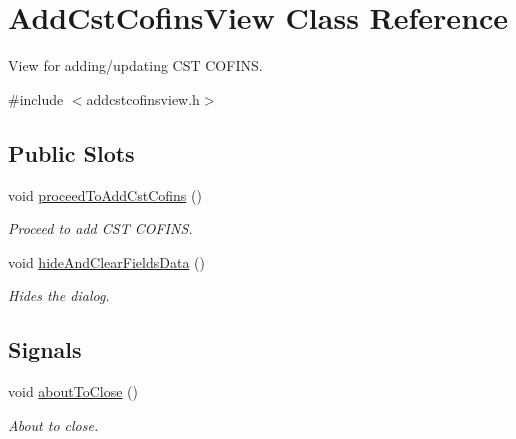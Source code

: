 \hypertarget{class_add_cst_cofins_view}{\section{\-Add\-Cst\-Cofins\-View \-Class \-Reference}
\label{class_add_cst_cofins_view}
}


\-View for adding/updating \-C\-S\-T \-C\-O\-F\-I\-N\-S.  




{\ttfamily \#include $<$addcstcofinsview.\-h$>$}

\subsection*{\-Public \-Slots}
\begin{DoxyCompactItemize}
\item 
void \hyperlink{class_add_cst_cofins_view_ae11fc93951de8c6526e67bea3c281bfa}{proceed\-To\-Add\-Cst\-Cofins} ()
\begin{DoxyCompactList}\small\item\em \-Proceed to add \-C\-S\-T \-C\-O\-F\-I\-N\-S. \end{DoxyCompactList}\item 
void \hyperlink{class_add_cst_cofins_view_ab1ecf96ab6159b15730e2c3af267b258}{hide\-And\-Clear\-Fields\-Data} ()
\begin{DoxyCompactList}\small\item\em \-Hides the dialog. \end{DoxyCompactList}\end{DoxyCompactItemize}
\subsection*{\-Signals}
\begin{DoxyCompactItemize}
\item 
void \hyperlink{class_add_cst_cofins_view_a8c4e217461e2cb913d4752fa2f2cd76a}{about\-To\-Close} ()
\begin{DoxyCompactList}\small\item\em \-About to close. \end{DoxyCompactList}\end{DoxyCompactItemize}
